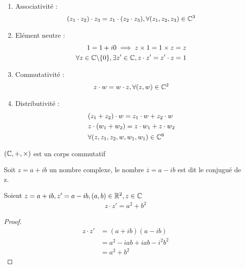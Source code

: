 \begin{proposition}
\begin{enumerate}
\begin{enumerate}
    \item Associativité :
    \begin{align*}
    (z_1 \cdot z_2) \cdot z_3 = z_1 \cdot (z_2 \cdot z_3), \forall (z_1, z_2, z_3) \in \mathbb{C}^3
    \end{align*}
    \item Elément neutre :
        \begin{align*}
        1 = 1 + i0 \implies z \times 1 = 1 \times z = z \\
        \forall z \in \mathbb{C} \backslash \{0\}, \exists z' \in \mathbb{C}, z \cdot z' = z' \cdot z =1
        \end{align*}
    \item Commutativité :
        \begin{align*}
        z \cdot w = w \cdot z, \forall (z, w) \in \mathbb{C}^2
        \end{align*}
    \item Distributivité :
        \begin{align*}
        &(z_1 + z_2) \cdot w = z_1 \cdot w + z_2 \cdot w \\
        &z \cdot (w_1 + w_2) = z \cdot w_1 + z \cdot w_2 \\
        &\forall (z, z_1, z_2, w, w_1, w_1) \in \mathbb{C}^6
        \end{align*}
\end{enumerate}

\end{enumerate}
\end{proposition}

\begin{remarque}
    $(\mathbb{C}, +, \times)$ est un corps commutatif 
\end{remarque}

\begin{definition}
    Soit $z = a + ib$ un nombre complexe, le nombre $\overline{z} = a - ib$ est dit le conjugué de z.
\end{definition}

\begin{proposition}
    Soient $z = a + ib, z'= a - ib, (a, b) \in \mathbb{R}^2, z \in \mathbb{C}$
    \begin{align*}
        z \cdot z' = a^2 + b^2
    \end{align*}
    \begin{proof}
        \begin{align*}
            z \cdot z' &= (a + ib)(a - ib) \\
                        &= a^2 -iab + iab -i^2b^2 \\
                        &= a^2 + b^2
        \end{align*}
    \end{proof}
\end{proposition}

